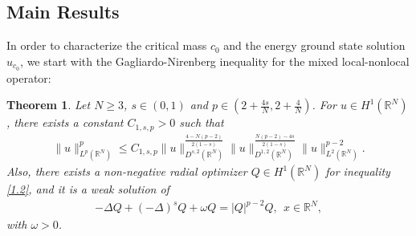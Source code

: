 \documentclass[12pt,a4paper,reqno]{amsart}
\numberwithin{equation}{section}
\newtheorem{theorem}{Theorem}[section]
\begin{document}
\subsection{Main Results}
In order to characterize the critical mass $c_{0}$ and the energy ground state solution $u_{c_{0}}$,
we start with the Gagliardo-Nirenberg inequality for the mixed local-nonlocal operator:
\begin{theorem}\label{Theorem1.2}
Let $N\geqslant3$,
$s\in(0,1)$
and $p\in(2+\frac{4s}{N},2+\frac{4}{N})$.
For $u\in H^{1}(\mathbb{R}^{N})$,
there exists a constant $C_{1,s,p}>0$ such that
\begin{equation}\label{1.2}
\begin{aligned}
\|u\|_{L^{p}(\mathbb{R}^{N})}^{p}
\leqslant
C_{1,s,p}
\|u\|_{D^{s,2}(\mathbb{R}^{N})}^{\frac{4-N(p-2)}{2(1-s)}}
\|u\|_{D^{1,2}(\mathbb{R}^{N})}^{\frac{N(p-2)-4s}{2(1-s)}}
\|u\|_{L^{2}(\mathbb{R}^{N})}^{p-2}.
\end{aligned}
\end{equation}
Also,
there exists a non-negative radial optimizer $Q\in H^{1}(\mathbb{R}^{N})$ for inequality \eqref{1.2},
and it is a weak solution of
\begin{equation*}
\begin{aligned}
-\Delta Q
+(-\Delta)^{s}Q+\omega Q=|Q|^{p-2}Q, \ \ x\in \mathbb{R}^{N},
\end{aligned}
\end{equation*}
with $\omega>0$.
\end{theorem}
\end{document}
